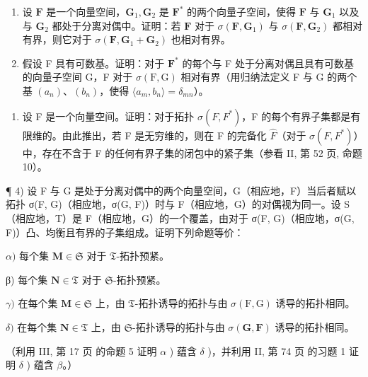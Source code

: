 \begin{enumerate}
\def\labelenumi{\alph{enumi})}
\setcounter{enumi}{1}
\item
  设 \(\mathbf{F}\) 是一个向量空间，\(\mathbf{G}_1, \mathbf{G}_2\) 是 \(\mathbf{F}^*\) 的两个向量子空间，使得 \(\mathbf{F}\) 与 \(\mathbf{G}_1\) 以及与 \(\mathbf{G}_2\) 都处于分离对偶中。证明：若 \(\mathbf{F}\) 对于 \(\sigma(\mathbf{F}, \mathbf{G}_1)\) 与 \(\sigma(\mathbf{F}, \mathbf{G}_2)\) 都相对有界，则它对于 \(\sigma(\mathbf{F}, \mathbf{G}_1 + \mathbf{G}_2)\) 也相对有界。
\item
  假设 F 具有可数基。证明：对于 \(\mathbf{F}^*\) 的每个与 F 处于分离对偶且具有可数基的向量子空间 G，F 对于 \(\sigma(\mathrm{F},\mathrm{G})\) 相对有界（用归纳法定义 F 与 G 的两个基 \((a_n)\)、\((b_n)\)，使得 \(\langle a_m, b_n \rangle = \delta_{mn}\)）。
\end{enumerate}

\begin{enumerate}
\def\labelenumi{\arabic{enumi})}
\setcounter{enumi}{2}
\tightlist
\item
  设 F 是一个向量空间。证明：对于拓扑 \(\sigma(F, F^{*})\)，F 的每个有界子集都是有限维的。由此推出，若 F 是无穷维的，则在 F 的完备化 \(\hat{F}\)（对于 \(\sigma(F, F^{*})\)）中，存在不含于 F 的任何有界子集的闭包中的紧子集（参看 II, 第 52 页, 命题 10）。
\end{enumerate}

¶ 4) 设 F 与 G 是处于分离对偶中的两个向量空间，G（相应地，F）当后者赋以拓扑 σ(F, G)（相应地，σ(G, F)）时与 F（相应地，G）的对偶视为同一。设 S（相应地，T）是 F（相应地，G）的一个覆盖，由对于 σ(F, G)（相应地，σ(G, F)）凸、均衡且有界的子集组成。证明下列命题等价：

\(\alpha)\) 每个集 \(\mathbf{M} \in \mathfrak{S}\) 对于 \(\mathfrak{T}\)-拓扑预紧。

β) 每个集 \(\mathbf{N} \in \mathfrak{T}\) 对于 \(\mathfrak{S}\)-拓扑预紧。

\(\gamma)\) 在每个集 \(\mathbf{M} \in \mathfrak{S}\) 上，由 \(\mathfrak{T}\)-拓扑诱导的拓扑与由 \(\sigma(\mathrm{F}, \mathrm{G})\) 诱导的拓扑相同。

\(\delta)\) 在每个集 \(\mathbf{N} \in \mathfrak{T}\) 上，由 \(\mathfrak{S}\)-拓扑诱导的拓扑与由 \(\sigma(\mathbf{G}, \mathbf{F})\) 诱导的拓扑相同。

（利用 III, 第 17 页 的命题 5 证明 \(\alpha\) ) 蕴含 \(\delta\) )，并利用 II, 第 74 页 的习题 1 证明 \(\delta\) ) 蕴含 \(\beta\)。）


